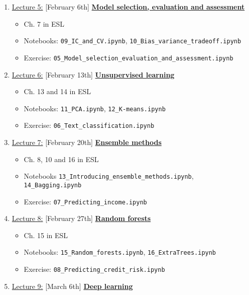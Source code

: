 \documentclass[12pt, a4paper]{article}
\begin{document}
\begin{enumerate}
{\begin{itemize}
          \end{itemize}
        }
  \item[] \underline{Lecture 5:} [February 6th] \underline{\bf Model selection, evaluation and assessment}
    {\small
      \begin{itemize}
        \item Ch. 7 in ESL
        \item Notebooks: \texttt{09\_IC\_and\_CV.ipynb}, \texttt{10\_Bias\_variance\_tradeoff.ipynb}
        \item Exercise: \texttt{05\_Model\_selection\_evaluation\_and\_assessment.ipynb}
      \end{itemize}
    }
  \item[] \underline{Lecture 6:} [February 13th] \underline{\bf Unsupervised learning}
    {\small
      \begin{itemize}
        \item Ch. 13 and 14 in ESL
        \item Notebooks: \texttt{11\_PCA.ipynb}, \texttt{12\_K-means.ipynb}
        \item Exercise: \texttt{06\_Text\_classification.ipynb}
      \end{itemize}
    }
  \item[] \underline{Lecture 7:} [February 20th] \underline{\bf Ensemble methods}
    {\small
      \begin{itemize}
        \item Ch. 8, 10 and  16 in ESL
        \item Notebooks \texttt{13\_Introducing\_ensemble\_methods.ipynb}, \texttt{14\_Bagging.ipynb}
        \item Exercise: \texttt{07\_Predicting\_income.ipynb}
      \end{itemize}
    }
  \item[] \underline{Lecture 8:} [February 27th] \underline{\bf Random forests}
    {\small
      \begin{itemize}
        \item Ch. 15 in ESL
        \item Notebooks: \texttt{15\_Random\_forests.ipynb}, \texttt{16\_ExtraTrees.ipynb}
        \item Exercise: \texttt{08\_Predicting\_credit\_risk.ipynb}
      \end{itemize}
    }
  \item[] \underline{Lecture 9:} [March 6th] \underline{\bf Deep learning}
    {\small
      \begin{itemize}

\end{itemize}}
\end{enumerate}
\end{document}
